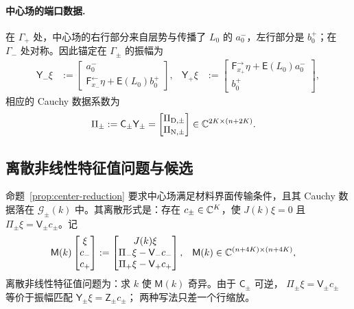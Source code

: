\paragraph{中心场的端口数据.}
在 $\Gamma_+$ 处，中心场的右行部分来自层势与传播了 $L_0$ 的 $a^-_0$，左行部分是
$b^+_0$；在 $\Gamma_-$ 处对称。因此锚定在 $\Gamma_\pm$ 的振幅为
\begin{align}
  \mathsf Y_-\xi
  &:=\begin{bmatrix}a^-_0\\ \mathsf F^{\leftarrow}_{x_-}\eta+\mathsf E(L_0)b^+_0\end{bmatrix},
  &\mathsf Y_+\xi
  &:=\begin{bmatrix}\mathsf F^{\rightarrow}_{x_+}\eta+\mathsf E(L_0)a^-_0\\ b^+_0\end{bmatrix},
  \label{eq:center-port-amplitudes}
\end{align}
相应的 Cauchy 数据系数为
\begin{align}
  \Pi_\pm&:=\mathsf C_\pm\mathsf Y_\pm
  =\begin{bmatrix}\Pi_{\mathrm D,\pm}\\ \Pi_{\mathrm N,\pm}\end{bmatrix}
  \in\mathbb{C}^{2K\times(n+2K)}.
  \label{eq:center-cauchy-extraction}
\end{align}

\subsection{离散非线性特征值问题与候选}
\label{subsec:discrete-nep}

命题~\ref{prop:center-reduction} 要求中心场满足材料界面传输条件，且其 Cauchy 数据落在
$\mathcal G_\pm(k)$ 中。其离散形式是：存在 $c_\pm\in\mathbb{C}^K$，使
$J(k)\xi=0$ 且 $\Pi_\pm\xi=\mathsf V_\pm c_\pm$。记
\begin{align}
  \mathsf M(k)
  \begin{bmatrix}\xi\\ c_-\\ c_+\end{bmatrix}
  &:=
  \begin{bmatrix}
    J(k)\xi\\
    \Pi_-\xi-\mathsf V_-c_-\\
    \Pi_+\xi-\mathsf V_+c_+
  \end{bmatrix},
  &\mathsf M(k)&\in\mathbb{C}^{(n+4K)\times(n+4K)},
  \label{eq:discrete-nep}
\end{align}
离散非线性特征值问题为：求 $k$ 使 $\mathsf M(k)$ 奇异。由于 $\mathsf C_\pm$ 可逆，
$\Pi_\pm\xi=\mathsf V_\pm c_\pm$ 等价于振幅匹配 $\mathsf Y_\pm\xi=\mathsf Z_\pm c_\pm$；
两种写法只差一个行缩放。

